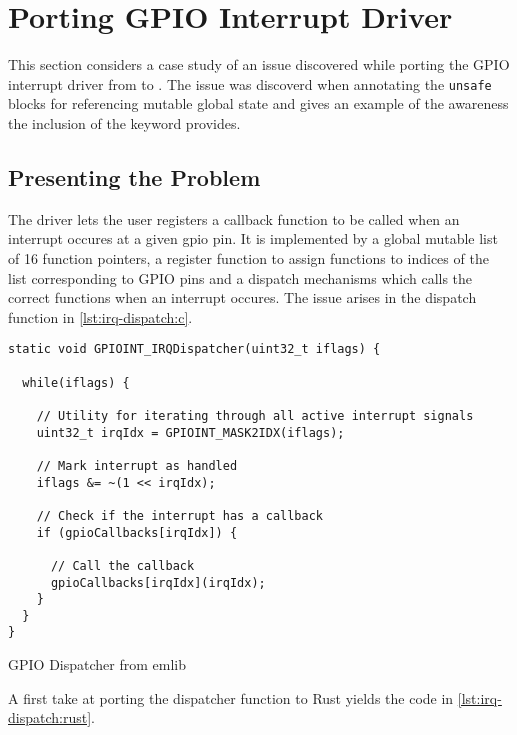\section{Porting GPIO Interrupt Driver}

This section considers a case study of an issue discovered while porting the GPIO interrupt driver from  to {\rust}.
The issue was discoverd when annotating the \texttt{unsafe} blocks for referencing mutable global state and gives an example of the awareness the inclusion of the {\unsafe} keyword provides.

\subsection{Presenting the Problem}

The driver lets the user registers a callback function to be called when an interrupt occures at a given \gls{gpio} pin.
It is implemented by a global mutable list of 16 function pointers, a register function to assign functions to indices of the list corresponding to GPIO pins and a dispatch mechanisms which calls the correct functions when an interrupt occures.
The issue arises in the dispatch function in \autoref{lst:irq-dispatch:c}.

\begin{listing}
  \begin{verbatim}
static void GPIOINT_IRQDispatcher(uint32_t iflags) {

  while(iflags) {

    // Utility for iterating through all active interrupt signals
    uint32_t irqIdx = GPIOINT_MASK2IDX(iflags);

    // Mark interrupt as handled
    iflags &= ~(1 << irqIdx);

    // Check if the interrupt has a callback
    if (gpioCallbacks[irqIdx]) {

      // Call the callback
      gpioCallbacks[irqIdx](irqIdx);
    }
  }
}
  \end{verbatim}
  \caption{GPIO Dispatcher from emlib}
  \label{lst:irq-dispatch:c}
\end{listing}

A first take at porting the dispatcher function to Rust yields the code in \autoref{lst:irq-dispatch:rust}.

